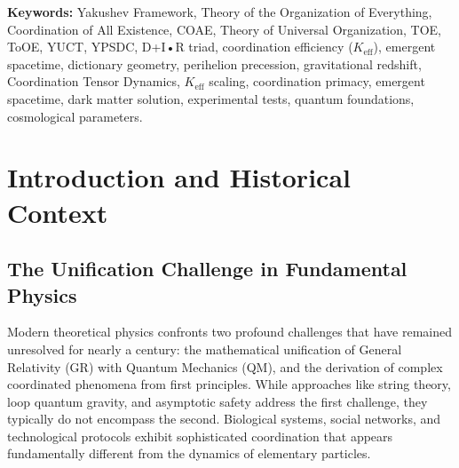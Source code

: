 \documentclass[11pt,a4paper]{article}
\begin{document}
\begin{abstract}
		The framework is microcausal ($v \leq c$ always), reproduces General Relativity and Quantum Mechanics in validated limits when coordination efficiency $K_{\mathrm{eff}} \to 1$, and provides testable predictions for precision measurements in astrophysics, particle physics, and quantum information.
		
		\vspace{0.5em}
		\noindent \textbf{Core Discovery:} 
		We identify the axiomatic backbone of the theory as a closed \textbf{Algebraic Loop} of fundamental constants ($S_{\mathrm{odd}} = 6/5$, $S_{\mathrm{even}} = 4/5$), which strictly determines the universal scaling exponent $\beta = 2/3$. We demonstrate that this loop forms a self-consistent, parameter-free logical system. The internal consistency of this structure is powerfully validated by an emergent high-precision geometric coincidence: $S_{\mathrm{odd}}\varphi^2 \approx \pi$ (error $10^{-5}$), linking the discrete mass spectrum of fermions directly to the continuous geometry of spacetime. This establishes YUCT not as a phenomenological fit, but as a unified, falsifiable axiomatic framework for the coordination dynamics of reality.
		
	\end{abstract}
	
	\noindent\textbf{Keywords:} Yakushev Framework, Theory of the Organization of Everything,  Coordination of All Existence, COAE, Theory of Universal Organization, TOE, ToOE, YUCT, YPSDC, D+I•R triad, coordination efficiency ($K_{\mathrm{eff}}$), emergent spacetime, dictionary geometry, perihelion precession, gravitational redshift, Coordination Tensor Dynamics, $K_{\mathrm{eff}}$ scaling, coordination primacy, emergent spacetime, dark matter solution, experimental tests, quantum foundations, cosmological parameters.
	\newpage
	\tableofcontents
	
	\newpage
	
	\section{Introduction and Historical Context}
	\subsection{The Unification Challenge in Fundamental Physics}
	Modern theoretical physics confronts two profound challenges that have remained unresolved for nearly a century: the mathematical unification of General Relativity (GR) with Quantum Mechanics (QM), and the derivation of complex coordinated phenomena from first principles. While approaches like string theory, loop quantum gravity, and asymptotic safety address the first challenge, they typically do not encompass the second. Biological systems, social networks, and technological protocols exhibit sophisticated coordination that appears fundamentally different from the dynamics of elementary particles.
	
\end{document}
